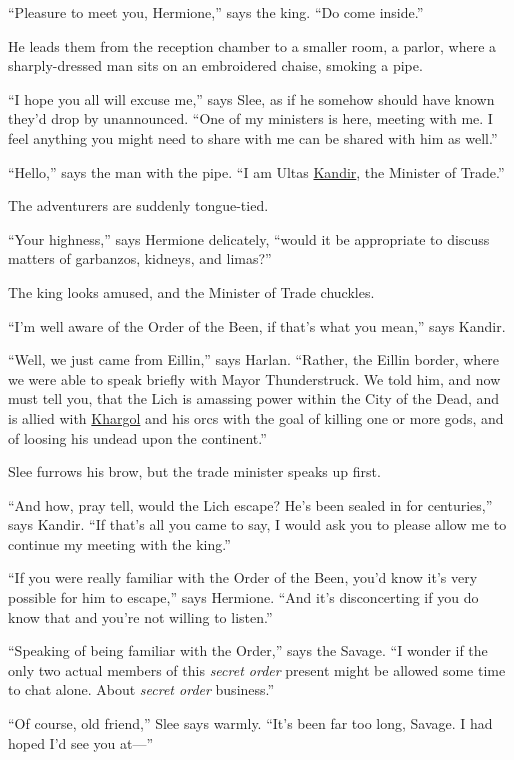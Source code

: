 \documentclass[smalldemyvopaper,11pt,twoside,onecolumn,openright,extrafontsizes]{memoir}
\newlength\drop
\begin{document}
``Pleasure to meet you, Hermione,'' says the king. ``Do come inside.''

He leads them from the reception chamber to a smaller room, a parlor,
where a sharply-dressed man sits on an embroidered chaise, smoking a
pipe.

``I hope you all will excuse me,'' says Slee, as if he somehow should
have known they'd drop by unannounced. ``One of my ministers is here,
meeting with me. I feel anything you might need to share with me can be
shared with him as well.''

``Hello,'' says the man with the pipe. ``I am Ultas
\href{/characters/kandir/}{Kandir}, the Minister of Trade.''

The adventurers are suddenly tongue-tied.

``Your highness,'' says Hermione delicately, ``would it be appropriate
to discuss matters of garbanzos, kidneys, and limas?''

The king looks amused, and the Minister of Trade chuckles.

``I'm well aware of the Order of the Been, if that's what you mean,''
says Kandir.

``Well, we just came from Eillin,'' says Harlan. ``Rather, the Eillin
border, where we were able to speak briefly with Mayor Thunderstruck. We
told him, and now must tell you, that the Lich is amassing power within
the City of the Dead, and is allied with
\href{/characters/khargol/}{Khargol} and his orcs with the goal of
killing one or more gods, and of loosing his undead upon the
continent.''

Slee furrows his brow, but the trade minister speaks up first.

``And how, pray tell, would the Lich escape? He's been sealed in for
centuries,'' says Kandir. ``If that's all you came to say, I would ask
you to please allow me to continue my meeting with the king.''

``If you were really familiar with the Order of the Been, you'd know
it's very possible for him to escape,'' says Hermione. ``And it's
disconcerting if you do know that and you're not willing to listen.''

``Speaking of being familiar with the Order,'' says the Savage. ``I
wonder if the only two actual members of this \emph{secret order}
present might be allowed some time to chat alone. About \emph{secret
order} business.''

``Of course, old friend,'' Slee says warmly. ``It's been far too long,
Savage. I had hoped I'd see you at---''
\end{document}

